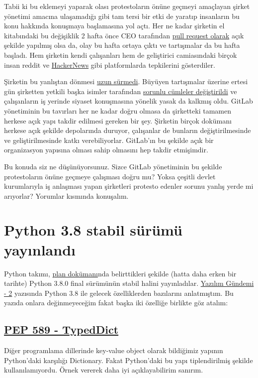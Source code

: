 \documentclass[11pt]{article}
\begin{document}
Tabii ki bu eklemeyi yaparak olası protestoların önüne geçmeyi amaçlayan şirket
yönetimi amacına ulaşamadığı gibi tam tersi bir etki de yaratıp insanların bu
konu hakkında konuşmaya başlamasına yol açtı. Her ne kadar şirketin el
kitabındaki bu değişiklik 2 hafta önce CEO tarafından \href{https://gitlab.com/gitlab-com/www-gitlab-com/merge\_requests/30656}{pull request olarak} açık
şekilde yapılmış olsa da, olay bu hafta ortaya çıktı ve tartışmalar da bu hafta
başladı. Hem şirketin kendi çalışanları hem de geliştirici camiasındaki birçok
insan reddit ve \href{https://news.ycombinator.com/item?id=21274511}{HackerNews} gibi platformlarda tepkilerini gösterdiler.

Şirketin bu yanlıştan dönmesi \href{https://www.theregister.co.uk/2019/10/17/gitlab\_reverse\_ferret/}{uzun sürmedi}. Büyüyen tartışmalar üzerine ertesi
gün şirketten yetkili başka isimler tarafından \href{https://gitlab.com/gitlab-com/www-gitlab-com/merge\_requests/32628/diffs}{sorunlu cümleler değiştirildi} ve
çalışanların iş yerinde siyaset konuşmasına yönelik yasak da kalkmış oldu.
GitLab yönetiminin bu tavırları her ne kadar doğru olmasa da şirketteki tamamen
herkese açık yapı takdir edilmesi gereken bir şey. Şirketin birçok dokümanı
herkese açık şekilde depolarında duruyor, çalışanlar de bunların
değiştirilmesinde ve geliştirilmesinde katkı verebiliyorlar. GitLab'ın bu
şekilde açık bir organizasyon yapısına olması sahip olmasını hep takdir
etmişimdir.

Bu konuda siz ne düşünüyorsunuz. Sizce GitLab yönetiminin bu şekilde
protestoların önüne geçmeye çalışması doğru mu? Yoksa çeşitli devlet
kurumlarıyla iş anlaşması yapan şirketleri protesto edenler sorunu yanlış yerde
mi arıyorlar? Yorumlar kısmında konuşalım.
\section{Python 3.8 stabil sürümü yayınlandı}
\label{sec:orgf8e49f4}
Python takımı, \href{https://www.python.org/dev/peps/pep-0569/\#release-schedule}{plan dokümanı}nda belirttikleri şekilde (hatta daha erken bir
tarihte) Python 3.8.0 final sürümünün stabil halini yayınladılar. \href{../02/yazilim-gundemi-02.pdf}{Yazılım
Gündemi - 2} yazısında Python 3.8 ile gelecek özelliklerden bazılarını
anlatmıştım. Bu yazıda onlara değinmeyeceğim fakat başka iki özelliğe birlikte
göz atalım:

\subsection{\href{https://www.python.org/dev/peps/pep-0589/}{PEP 589 - TypedDict}}
\label{sec:org3eee169}
Diğer programlama dillerinde key-value object olarak bildiğimiz yapının
Python'daki karşılığı Dictionary. Fakat Python'daki bu yapı tiplendirilmiş
şekilde kullanılamıyordu. Örnek vererek daha iyi açıklayabilirim sanırım.
\end{document}
